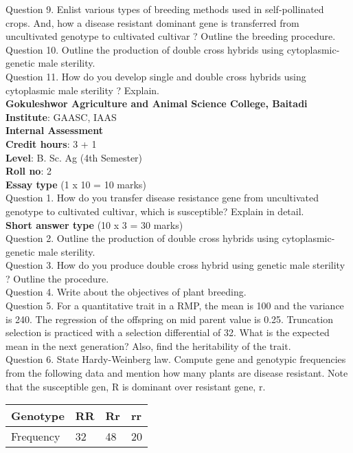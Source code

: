 \documentclass[12pt]{article}\usepackage[]{graphicx}\usepackage[]{color}
\begin{document}
Question 9. Enlist various types of breeding methods used in self-pollinated crops. And, how a disease resistant dominant gene is transferred from uncultivated genotype to cultivated cultivar ? Outline the breeding procedure.\\
Question 10. Outline the production of double cross hybrids using cytoplasmic-genetic male sterility.\\
Question 11. How do you develop single and double cross hybrids using cytoplasmic male sterility ? Explain.\\
\clearpage 
{\centering \Large{\textbf{Gokuleshwor Agriculture and Animal Science College, Baitadi}} \\[0.25cm]
            \textbf{Institute}: GAASC, IAAS \\[0.2cm]
            \textbf{Internal Assessment} \\[0.2cm]} 
\textbf{Credit hours}: 3 + 1 \\ 
\textbf{Level}: B. Sc. Ag (4th Semester) \\
\textbf{Roll no}: 2 \\[0.5cm] 
\textbf{Essay type} (1 x 10 = 10 marks) \\
Question 1. How do you transfer disease resistance gene from uncultivated genotype to cultivated cultivar, which is susceptible? Explain in detail.\\
\textbf{Short answer type} (10 x 3 = 30 marks) \\
Question 2. Outline the production of double cross hybrids using cytoplasmic-genetic male sterility.\\
Question 3. How do you produce double cross hybrid using genetic male sterility ? Outline the procedure.\\
Question 4. Write about the objectives of plant breeding.\\
Question 5. For a quantitative trait in a RMP, the mean is 100 and the variance is 240. The regression of the offspring on mid parent value is 0.25. Truncation selection is practiced with a selection differential of 32. What is the expected mean in the next generation? Also, find the heritability of the trait.\\
Question 6. State Hardy-Weinberg law. Compute gene and genotypic frequencies from the following data and mention how many plants are disease resistant. Note that the susceptible gen, R is dominant over resistant gene, r.\\ 
\begin{table}[H]
\centering\begingroup\fontsize{8}{10}\selectfont

\begin{tabular}[t]{llll}
\toprule
Genotype & RR & Rr & rr\\
\midrule
Frequency & 32 & 48 & 20\\
\bottomrule
\end{tabular}
\endgroup{}
\end{table}
\end{document}
